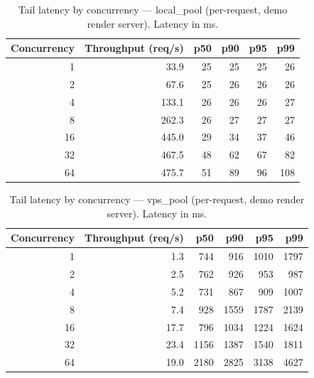 \begin{table}[htbp]
\centering
\caption{Tail latency by concurrency --- local\_pool (per-request, demo render server). Latency in ms.}
\label{tab:tail_latency_local_pool}
\begin{tabular}{rrrrrr}
\toprule
Concurrency & Throughput (req/s) & p50 & p90 & p95 & p99 \\
\midrule
1 & 33.9 & 25 & 25 & 25 & 26 \\
2 & 67.6 & 25 & 26 & 26 & 26 \\
4 & 133.1 & 26 & 26 & 26 & 27 \\
8 & 262.3 & 26 & 27 & 27 & 27 \\
16 & 445.0 & 29 & 34 & 37 & 46 \\
32 & 467.5 & 48 & 62 & 67 & 82 \\
64 & 475.7 & 51 & 89 & 96 & 108 \\
\bottomrule
\end{tabular}
\end{table}

\begin{table}[htbp]
\centering
\caption{Tail latency by concurrency --- vps\_pool (per-request, demo render server). Latency in ms.}
\label{tab:tail_latency_vps_pool}
\begin{tabular}{rrrrrr}
\toprule
Concurrency & Throughput (req/s) & p50 & p90 & p95 & p99 \\
\midrule
1 & 1.3 & 744 & 916 & 1010 & 1797 \\
2 & 2.5 & 762 & 926 & 953 & 987 \\
4 & 5.2 & 731 & 867 & 909 & 1007 \\
8 & 7.4 & 928 & 1559 & 1787 & 2139 \\
16 & 17.7 & 796 & 1034 & 1224 & 1624 \\
32 & 23.4 & 1156 & 1387 & 1540 & 1811 \\
64 & 19.0 & 2180 & 2825 & 3138 & 4627 \\
\bottomrule
\end{tabular}
\end{table}

